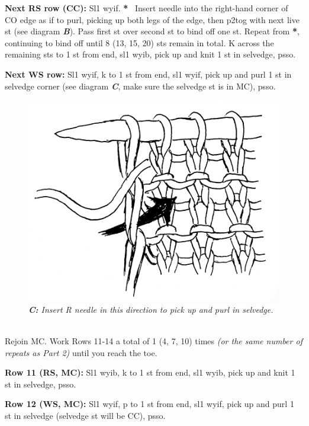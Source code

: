 \documentclass[12pt]{article}
\newcommand{\vocab}[1]{\emph{\textbf{#1}}} %
\newcommand{\rowDir}[1]{\textbf{#1:}} %
\newcommand{\repmark}{\textbf{*}}
\begin{document}
\rowDir{Next RS row (CC)}  Sl1 wyif. \repmark~ Insert needle into the right-hand corner of CO edge as if to purl, picking up both legs of the edge, then p2tog with next live st (see diagram \vocab{B}). Pass first st over second st to bind off one st. Repeat from \repmark, continuing to bind off until 8 (13, 15, 20) sts remain in total. K across the remaining sts to 1 st from end, sl1 wyib, pick up and knit 1 st in selvedge, psso.

\rowDir{Next WS row} Sl1 wyif, k to 1 st from end, sl1 wyif, pick up and purl 1 st in selvedge corner (see diagram \vocab{C}, make sure the selvedge st is in MC), psso.

\begin{figure}
\includegraphics[width=\linewidth]{punp.png}
\emph{\small \textbf{C:} Insert R needle in this direction to pick up and purl in selvedge.}
\vspace{-1em}
\end{figure} \leavevmode

~\\
Rejoin MC. Work Rows 11-14 a total of 1 (4, 7, 10) times \emph{(or the same number of repeats as Part 2)} until you reach the toe.

\rowDir{Row 11 (RS, MC)} Sl1 wyib, k to 1 st from end, sl1 wyib, pick up and knit 1 st in selvedge, psso.

\rowDir{Row 12 (WS, MC)} Sl1 wyif, p to 1 st from end, sl1 wyif, pick up and purl 1 st in selvedge (selvedge st will be CC), psso.
\end{document}
